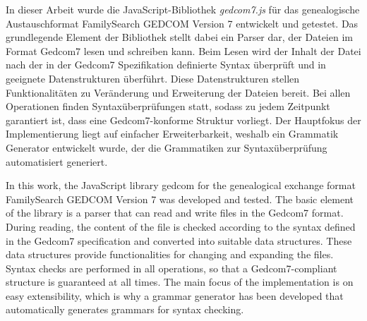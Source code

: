 \kurzfassung
In dieser Arbeit wurde die JavaScript-Bibliothek \textit{gedcom7.js} für das genealogische Austauschformat FamilySearch GEDCOM Version 7 entwickelt und getestet. Das grundlegende Element der Bibliothek stellt dabei ein Parser dar, der Dateien im Format Gedcom7 lesen und schreiben kann. Beim Lesen wird der Inhalt der Datei nach der in der Gedcom7 Spezifikation definierte Syntax überprüft und in geeignete Datenstrukturen überführt. Diese Datenstrukturen stellen Funktionalitäten zu Veränderung und Erweiterung der Dateien bereit. Bei allen Operationen finden Syntaxüberprüfungen statt, sodass zu jedem Zeitpunkt garantiert ist, dass eine Gedcom7-konforme Struktur vorliegt. Der Hauptfokus der Implementierung liegt auf einfacher Erweiterbarkeit, weshalb ein Grammatik Generator entwickelt wurde, der die Grammatiken zur Syntaxüberprüfung automatisiert generiert.

\kurzfassungEN
In this work, the JavaScript library  gedcom for the genealogical exchange format FamilySearch GEDCOM Version 7 was developed and tested. The basic element of the library is a parser that can read and write files in the Gedcom7 format. During reading, the content of the file is checked according to the syntax defined in the Gedcom7 specification and converted into suitable data structures. These data structures provide functionalities for changing and expanding the files. Syntax checks are performed in all operations, so that a Gedcom7-compliant structure is guaranteed at all times. The main focus of the implementation is on easy extensibility, which is why a grammar generator has been developed that automatically generates grammars for syntax checking.
